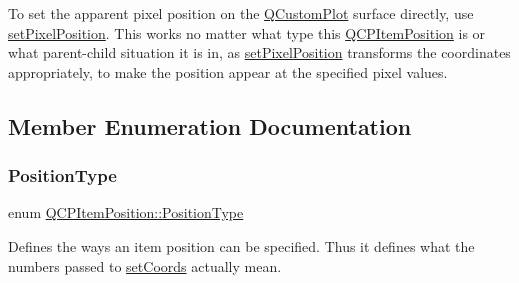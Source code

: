To set the apparent pixel position on the \mbox{\hyperlink{class_q_custom_plot}{Q\+Custom\+Plot}} surface directly, use \mbox{\hyperlink{class_q_c_p_item_position_a8d4f858f2089973967cf9cb81970ef0a}{set\+Pixel\+Position}}. This works no matter what type this \mbox{\hyperlink{class_q_c_p_item_position}{Q\+C\+P\+Item\+Position}} is or what parent-\/child situation it is in, as \mbox{\hyperlink{class_q_c_p_item_position_a8d4f858f2089973967cf9cb81970ef0a}{set\+Pixel\+Position}} transforms the coordinates appropriately, to make the position appear at the specified pixel values. 

\subsection{Member Enumeration Documentation}
\mbox{\label{class_q_c_p_item_position_aad9936c22bf43e3d358552f6e86dbdc8}} 
\subsubsection{\texorpdfstring{PositionType}{PositionType}}
{\footnotesize\ttfamily enum \mbox{\hyperlink{class_q_c_p_item_position_aad9936c22bf43e3d358552f6e86dbdc8}{Q\+C\+P\+Item\+Position\+::\+Position\+Type}}}

Defines the ways an item position can be specified. Thus it defines what the numbers passed to \mbox{\hyperlink{class_q_c_p_item_position_aa988ba4e87ab684c9021017dcaba945f}{set\+Coords}} actually mean.

